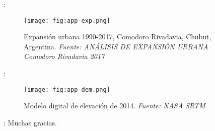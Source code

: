 \begin{frame}{\secname : \subsecname}
  \begin{figure}
    \centering
    \texttt{[image: fig:app-exp.png]}
    \caption{Expansión urbana 1990-2017, Comodoro Rivadavia, Chubut, Argentina. \emph{Fuente: ANÁLISIS DE
EXPANSIÓN URBANA Comodoro Rivadavia 2017}}
    \label{}
  \end{figure}
\end{frame}

\begin{frame}{\secname : \subsecname}
  \begin{figure}
    \centering
    \texttt{[image: fig:app-dem.png]}
    \caption{Modelo digital de elevación de 2014. \emph{Fuente: NASA SRTM}}
    \label{}
  \end{figure}
\end{frame}



\begin{frame}{\secname : \subsecname}
Muchas gracias.
\end{frame}
